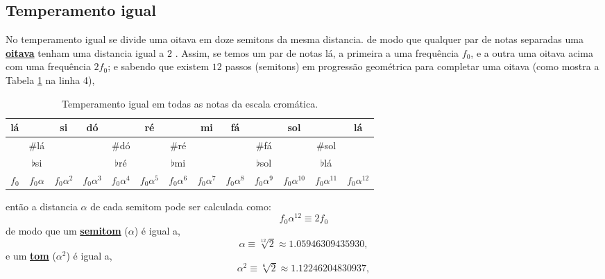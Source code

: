 \subsection{Temperamento igual}
\label{subsec:tempigual}
No  temperamento igual se divide uma oitava em doze semitons da mesma distancia.
de modo que qualquer par de notas separadas uma 
\hyperref[sec:pos:Oitava]{\textbf{oitava}} tenham uma distancia igual a $2$ \cite[pp. 835]{apel1969harvard}.
Assim, se temos um par de notas lá, a primeira a uma frequência $f_0$, 
e a outra uma oitava acima com uma frequência $2f_0$;
e sabendo que existem $12$ passos (semitons) em progressão  geométrica para completar uma oitava 
(como mostra a Tabela \ref{tab:temperamento1} na linha 4),
\begin{table}[h]
\centering
\begin{tabular}{|c|c|c|c|c|c|c|c|c|c|c|c||c|}
\hline
 lá  & ~ & si  & dó  & ~ & ré  & ~ & mi  & fá  & ~ & sol   & ~ & lá\\ \hline
 ~  & $\#$lá  & ~  & ~  & $\#$dó  & ~  & $\#$ré  & ~  & ~  & $\#$fá  & ~   & $\#$sol   & ~\\ \hline
 ~  & $\flat$si  & ~  & ~  &  $\flat$ré  & ~  &  $\flat$mi  & ~  & ~  &  $\flat$sol  & ~   &  $\flat$lá   & ~\\ \hline
$f_0$ & $f_0\alpha$ & $f_0\alpha^2$ & $f_0\alpha^3$ & $f_0\alpha^4$ & $f_0\alpha^5$ & $f_0\alpha^6$ & $f_0\alpha^7$ & $f_0\alpha^8$ & $f_0\alpha^9$ & $f_0\alpha^{10}$ & $f_0\alpha^{11}$ & $f_0\alpha^{12}$ \\ \hline
\end{tabular}
\caption{Temperamento igual em todas as notas da escala cromática.}
\label{tab:temperamento1}
\end{table}
então a distancia $\alpha$ de cada semitom pode ser calculada como:
\begin{equation}
f_0\alpha^{12}\equiv 2 f_0
\end{equation}
de modo que um \hyperref[sec:pos:Semitom]{\textbf{semitom}} ($\alpha$) é igual a,
\begin{equation}
\alpha \equiv \sqrt[12]{2} \approx  1.05946309435930,
\end{equation}
e um \hyperref[sec:pos:TomDist]{\textbf{tom}} ($\alpha^2$) é igual a,
\begin{equation}
\alpha^2 \equiv \sqrt[6]{2} \approx  1.12246204830937,
\end{equation}

